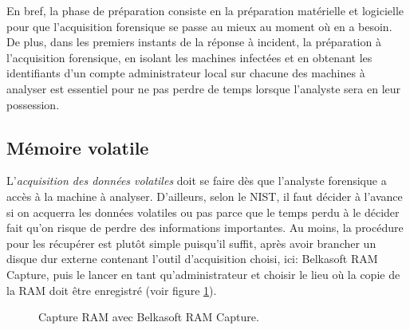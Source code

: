 En bref, la phase de préparation consiste en la préparation matérielle et logicielle pour que l'acquisition forensique se passe au mieux au moment où en a besoin. De plus, dans les premiers instants de la réponse à incident, la préparation à l'acquisition forensique, en isolant les machines infectées et en obtenant les identifiants d'un compte administrateur local sur chacune des machines à analyser est essentiel pour ne pas perdre de temps lorsque l'analyste sera en leur possession.





\subsection{Mémoire volatile}

L'\textit{acquisition des données volatiles} doit se faire dès que l'analyste forensique a accès à la machine à analyser. D'ailleurs, selon le NIST, il faut décider à l'avance si on acquerra les données volatiles ou pas parce que le temps perdu à le décider fait qu'on risque de perdre des informations importantes. \cite{5} Au moins, la procédure pour les récupérer est plutôt simple puisqu'il suffit, après avoir brancher un disque dur externe contenant l'outil d'acquisition choisi, ici: Belkasoft RAM Capture, puis le lancer en tant qu'administrateur et choisir le lieu où la copie de la RAM doit être enregistré (voir figure \ref{fig:belkasoft-ram-capture}).

\begin{figure}
    \centering
    \caption{Capture RAM avec Belkasoft RAM Capture.}
    \label{fig:belkasoft-ram-capture}
\end{figure}





